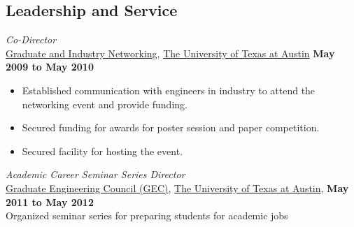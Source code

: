 \documentclass[centered]{res}
\begin{document}
\begin{resume}



\section{Leadership and Service}
\textit{Co-Director} \\
\href{http://gain.engr.utexas.edu/}{Graduate and Industry Networking},
\href{http://www.utexas.edu}{The University of Texas at Austin}
\hfill \textbf{May 2009 to May 2010}
\begin{itemize} \itemsep -2pt %
\item Established communication with engineers in industry to attend the networking event and provide funding.
\item Secured funding for awards for poster session and paper competition.
\item Secured facility for hosting the event.  
\end{itemize}

\textit{Academic Career Seminar Series Director} \\
\href{http://sites.google.com/site/utexasgecouncil/}{Graduate Engineering Council (GEC)},
\href{http://www.utexas.edu}{The University of Texas at Austin},
\hfill \textbf{May 2011 to May 2012} \\ 
Organized seminar series for preparing students for academic jobs


\end{resume}
\end{document}
